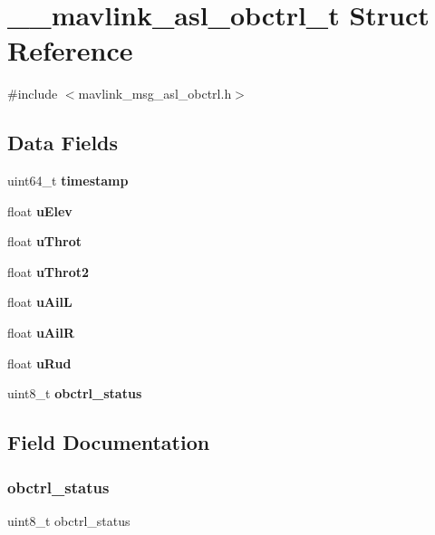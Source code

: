 \section{\+\_\+\+\_\+mavlink\+\_\+asl\+\_\+obctrl\+\_\+t Struct Reference}
\label{struct____mavlink__asl__obctrl__t}


{\ttfamily \#include $<$mavlink\+\_\+msg\+\_\+asl\+\_\+obctrl.\+h$>$}

\subsection*{Data Fields}
\begin{DoxyCompactItemize}
\item 
uint64\+\_\+t \textbf{ timestamp}
\item 
float \textbf{ u\+Elev}
\item 
float \textbf{ u\+Throt}
\item 
float \textbf{ u\+Throt2}
\item 
float \textbf{ u\+AilL}
\item 
float \textbf{ u\+AilR}
\item 
float \textbf{ u\+Rud}
\item 
uint8\+\_\+t \textbf{ obctrl\+\_\+status}
\end{DoxyCompactItemize}


\subsection{Field Documentation}
\mbox{\label{struct____mavlink__asl__obctrl__t_a979e2e2b8eb1a2a2084c235f6da3a9e6}} 
\subsubsection{obctrl\+\_\+status}
{\footnotesize\ttfamily uint8\+\_\+t obctrl\+\_\+status}

\mbox{\label{struct____mavlink__asl__obctrl__t_a465bef81f6478756e5443025b1f2ddfa}} 
